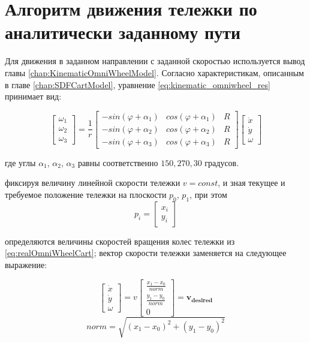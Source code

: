 \documentclass[oneside,final,14pt]{extreport}
\newcommand{\bs}{\boldsymbol}
\begin{document}
\section{Алгоритм движения тележки по аналитически заданному пути}
\label{chap:cartMovingAlg}
Для движения в заданном направлении с заданной скоростью используется вывод главы \ref{chap:KinematicOmniWheelModel}. Согласно характеристикам, описанным в главе \ref{chap:SDFCartModel}, уравнение \ref{eq:kinematic_omniwheel_res} принимает вид:

\begin{equation}
\label{eq:realOmniWheelCart}
\begin{bmatrix}
\omega_{1} \\
\omega_{2} \\
\omega_{3}
\end{bmatrix}
=
\frac{1}{r}
\begin{bmatrix}
-sin(\varphi +\alpha_{1}) &
cos(\varphi +\alpha_{1}) &
R
\\
-sin(\varphi +\alpha_{2}) &
cos(\varphi +\alpha_{2}) &
R
\\
-sin(\varphi +\alpha_{3}) &
cos(\varphi +\alpha_{3}) &
R
\end{bmatrix}
\begin{bmatrix}
\dot{x} \\
\dot{y} \\
\omega
\end{bmatrix}
\end{equation}

где углы $\alpha_1$, $\alpha_2$, $\alpha_3$ равны соответственно $150, 270, 30$ градусов.

фиксируя величину линейной скорости тележки $v = const$, и зная текущее и требуемое положение тележки на плоскости $p_0$, $p_1$, при этом  
\begin{equation}
p_i 
= 
\begin{bmatrix}
x_i
\\
y_i
\end{bmatrix} 
\end{equation}

определяются величины скоростей вращения колес тележки из \ref{eq:realOmniWheelCart}; вектор скорости тележки заменяется на следующее выражение:

\begin{equation}
\begin{bmatrix}
\dot{x} \\
\dot{y} \\
\omega
\end{bmatrix}
=
v
\begin{bmatrix}
\frac{x_1 - x_0}{norm} \\
\frac{y_1 - y_0}{norm} \\
0
\end{bmatrix}
=
\bs{v_{desired}}
\end{equation}
\begin{equation}
norm = \sqrt{(x_1 - x_0)^2 + (y_1 -y_0)^2}
\end{equation}
\end{document}
